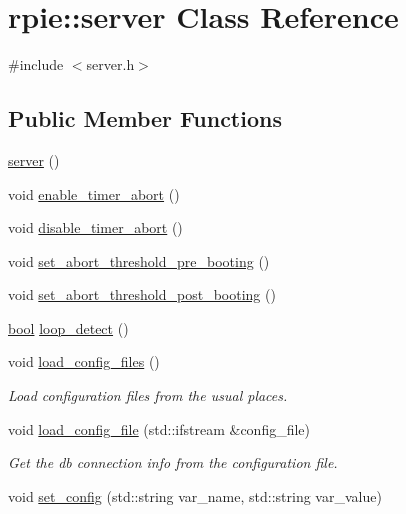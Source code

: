 \hypertarget{classrpie_1_1server}{\section{rpie\-:\-:server Class Reference}
\label{classrpie_1_1server}
}


{\ttfamily \#include $<$server.\-h$>$}

\subsection*{Public Member Functions}
\begin{DoxyCompactItemize}
\item 
\hyperlink{classrpie_1_1server_a4d7e80c010ab839b337fd486343fdd37}{server} ()
\item 
void \hyperlink{classrpie_1_1server_a0878d4b792bf0419e9771260734259f3}{enable\-\_\-timer\-\_\-abort} ()
\item 
void \hyperlink{classrpie_1_1server_a7dbbbef5b5fc6a5a2e9de920e656c3ab}{disable\-\_\-timer\-\_\-abort} ()
\item 
void \hyperlink{classrpie_1_1server_a00a169982369b9b421d088a282cc0e97}{set\-\_\-abort\-\_\-threshold\-\_\-pre\-\_\-booting} ()
\item 
void \hyperlink{classrpie_1_1server_a89750323d0889e6fd34072577cc8ddea}{set\-\_\-abort\-\_\-threshold\-\_\-post\-\_\-booting} ()
\item 
\hyperlink{structs_8h_ad5c9d4ba3dc37783a528b0925dc981a0}{bool} \hyperlink{classrpie_1_1server_adc04d858a407001f5bf907cad65255eb}{loop\-\_\-detect} ()
\item 
void \hyperlink{classrpie_1_1server_a6bed490717d2450853502414d32bb6a9}{load\-\_\-config\-\_\-files} ()
\begin{DoxyCompactList}\small\item\em Load configuration files from the usual places. \end{DoxyCompactList}\item 
void \hyperlink{classrpie_1_1server_a777008330eb6140447cc7f83aac3173d}{load\-\_\-config\-\_\-file} (std\-::ifstream \&config\-\_\-file)
\begin{DoxyCompactList}\small\item\em Get the db connection info from the configuration file. \end{DoxyCompactList}\item 
void \hyperlink{classrpie_1_1server_a79b7cfd755ff68761de7d8b4aa6ed5c4}{set\-\_\-config} (std\-::string var\-\_\-name, std\-::string var\-\_\-value)

\end{DoxyCompactItemize}
